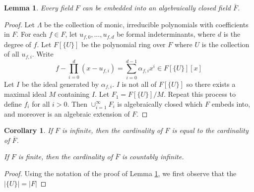\documentclass[12pt]{article}
\theoremstyle{plain}
\newtheorem{lemma}[thm]{Lemma}
\newtheorem{cor}[thm]{Corollary}
\theoremstyle{definition}
\begin{document}
	\begin{lemma}
		\label{algebraicclosure}
		Every field $F$ can be embedded into an algebraically closed field $\bar{F}$.
	\end{lemma}
	\begin{proof}
		Let $\Lambda$ be the collection of monic, irreducible polynomials with coefficients in $F$. For each $f \in F$, let $u_{f,0},...,u_{f,d}$ be formal indeterminants, where $d$ is the degree of $f$. Let $F[\lbrace U\rbrace]$ be the polynomial ring over $F$ where $U$ is the collection of all $u_{f,i}$. Write
		\[f - \prod_{i = 0}^d(x - u_{f,i}) = \sum_{i = 0}^{d-1}\alpha_{f,i}x^i \in F[\lbrace U \rbrace][x]\]
		Let $I$ be the ideal generated by $\alpha_{f,i}$. $I$ is not all of $F[\lbrace U \rbrace]$ so there exists a maximal ideal $M$ containing $I$. Let $F_1 = F[\lbrace U \rbrace]/M$. Repeat this process to define $f_i$ for all $i > 0$. Then $\cup_{i = 1}^\infty F_i$ is algebraically closed which $F$ embeds into, and moreover is an algebraic extension of $F$.
	\end{proof}

\begin{cor}
	If $F$ is infinite, then the cardinality of $F$ is equal to the cardinality of $\overline{F}$.
	
	If $F$ is finite, then the cardinality of $\overline{F}$ is countably infinite.
	\end{cor}
\begin{proof}
	Using the notation of the proof of Lemma \ref{algebraicclosure}, we first observe that the $|\{ U \}| = | F |$
	\end{proof}
\end{document}
